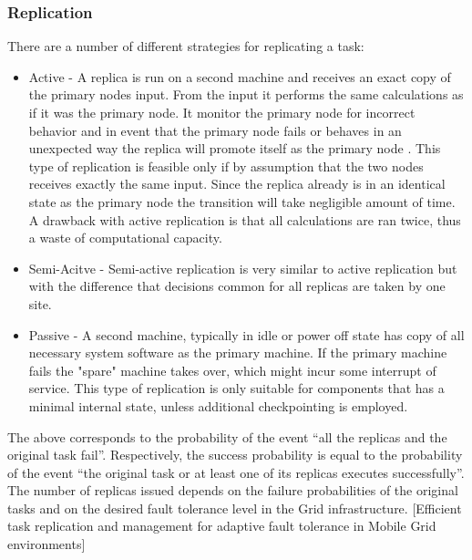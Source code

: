 \documentclass{cslthse-msc}
\begin{document}
\subsubsection{Replication}
There are a number of different strategies for replicating a task:
\begin{itemize}
\item Active - A replica is run on a second machine and receives an exact copy of the primary nodes input. From the input it performs the same calculations as if it was the primary node. It monitor the primary node for incorrect behavior and in event that the primary node fails or behaves in an unexpected way the replica will promote itself as the primary node \cite{surveyFaultParallel}. This type of replication is feasible only if by assumption that the two nodes receives exactly the same input. Since the replica already is in an identical state as the primary node the transition will take negligible amount of time. A drawback with active replication is that all calculations are ran twice, thus a waste of computational capacity. 

\item Semi-Acitve - Semi-active replication is very similar to active replication but with the difference that decisions common for all replicas are taken by one site. 

\item Passive - A second machine, typically in idle or power off state has  copy of all necessary system software as the primary machine. If the primary machine fails the "spare" machine takes over, which might incur some interrupt of service. This type of replication is only suitable for components that has a minimal internal state, unless additional checkpointing is employed. 
\end{itemize}

The above corresponds to the probability of the event “all the replicas and the original task fail”. Respectively, the success probability is equal to the probability of the event “the original task or at least one of its replicas executes successfully”. The number of replicas issued depends on the failure probabilities of the original tasks and on the desired fault tolerance level in the Grid infrastructure. [Efficient task replication and management for adaptive fault tolerance in Mobile Grid environments]
\end{document}
